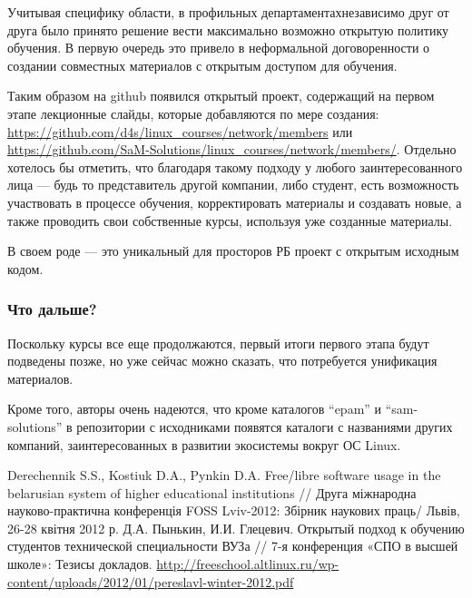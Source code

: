 \documentclass[10pt, a5paper]{article}
\begin{document}
Учитывая специфику области, в профильных департаментах\linebreak независимо друг от друга было принято решение вести максимально возможно открытую политику обучения.
В первую очередь это привело в неформальной договоренности о создании совместных материалов с открытым доступом для обучения.

Таким образом на github появился открытый проект, содержащий на первом этапе лекционные слайды, которые добавляются по мере создания: \url{https://github.com/d4s/linux\_courses/network/members} или \url{https://github.com/SaM-Solutions/linux\_courses/network/members/}. Отдельно хотелось бы отметить, что благодаря такому подходу у любого заинтересованного лица --- будь то представитель другой компании, либо студент, есть возможность участвовать в процессе обучения, корректировать материалы и создавать новые, а также проводить свои собственные курсы, используя уже созданные материалы.

В своем роде --- это уникальный для просторов РБ проект с открытым исходным кодом.

\subsubsection*{Что дальше?}

Поскольку курсы все еще продолжаются, первый итоги первого этапа будут подведены позже, но уже сейчас можно сказать, что потребуется унификация материалов.

Кроме того, авторы очень надеются, что кроме каталогов “epam” и “sam-solutions” в репозитории с исходниками появятся каталоги с названиями других компаний, заинтересованных в развитии экосистемы вокруг ОС Linux.

\begin{thebibliography}{9}
 {Derechennik S.S., Kostiuk D.A., Pynkin D.A. Free/libre software usage in the belarusian system of higher educational institutions // Друга міжнародна науково-практична конференція FOSS Lviv-2012: Збірник наукових праць/ Львів, 26-28 квітня 2012 р.}
 {Д.А. Пынькин, И.И. Глецевич. Открытый подход к обучению студентов технической
специальности ВУЗа // 7-я конференция «СПО в высшей школе»: Тезисы докладов. \url{http://freeschool.altlinux.ru/wp-content/uploads/2012/01/pereslavl-winter-2012.pdf}}\end{thebibliography}
\end{document}
